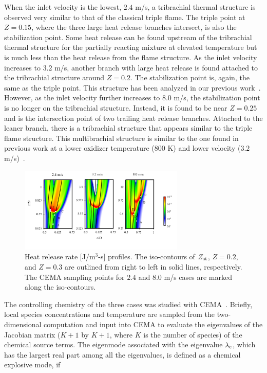 \documentclass[review,3p,times]{elsarticle}
\begin{document}
When the inlet velocity is the lowest, $2.4$ m/s, a tribrachial thermal structure is observed very similar to that of the classical triple flame.  The triple point at $Z = 0.15$, where the three large heat release branches intersect, is also the stabilization point.  Some heat release can be found upstream of the tribrachial thermal structure for the partially reacting mixture at elevated temperature but is much less than the heat release from the flame structure.  As the inlet velocity increases to $3.2$ m/s, another branch with large heat release is found attached to the tribrachial structure around $Z = 0.2$.  The stabilization point is, again, the same as the triple point.  This structure has been analyzed in our previous work~\cite{deng15}.  However, as the inlet velocity further increases to $8.0$ m/s, the stabilization point is no longer on the tribrachial structure.  Instead, it is found to be near $Z = 0.25$ and is the intersection point of two trailing heat release branches.  Attached to the leaner branch, there is a tribrachial structure that appears similar to the triple flame structure.  This multibrachial structure is similar to the one found in previous work at a lower oxidizer temperature ($800$ K) and lower velocity ($3.2$ m/s)~\cite{deng15}.

\begin{figure}[t]
  \centering
  \scriptsize
  \vspace{-0.1in}
  \includegraphics[width=0.7\textwidth]{HRR_V.png}
  \normalsize
  \vspace{-0.4in}
  \caption{Heat release rate [J/m$^3$-s] profiles.  The iso-contours of $Z_{\rm st}$, $Z = 0.2$, and $Z = 0.3$ are outlined from right to left in solid lines, respectively.  The CEMA sampling points for $2.4$ and $8.0$ m/s cases are marked along the iso-contours.}
  \label{fig:HRR_V}
\end{figure}

The controlling chemistry of the three cases was studied with CEMA~\cite{lu10,shan12}.   Briefly, local species concentrations and temperature are sampled from the two-dimensional computation and input into CEMA to evaluate the eigenvalues of the Jacobian matrix ($K + 1$ by $K + 1$, where $K$ is the number of species) of the chemical source terms.  The eigenmode associated with the eigenvalue $\lambda_{\rm e}$, which has the largest real part among all the eigenvalues, is defined as a chemical explosive mode, if
\end{document}
